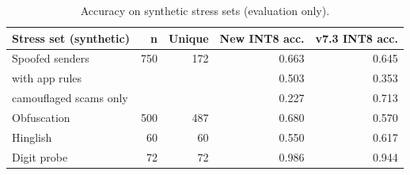 \begin{table}[t]
\centering
\caption{Accuracy on synthetic stress sets (evaluation only).}
\label{tab:stress}
\small
\begin{tabular}{lrrrr}
\toprule
Stress set (synthetic) & n & Unique & New INT8 acc. & v7.3 INT8 acc. \\
\midrule
Spoofed senders & 750 & 172 & 0.663 & 0.645 \\
\quad with app rules &  &  & 0.503 & 0.353 \\
\quad camouflaged scams only &  &  & 0.227 & 0.713 \\
Obfuscation & 500 & 487 & 0.680 & 0.570 \\
Hinglish & 60 & 60 & 0.550 & 0.617 \\
Digit probe & 72 & 72 & 0.986 & 0.944 \\
\bottomrule
\end{tabular}
\end{table}
